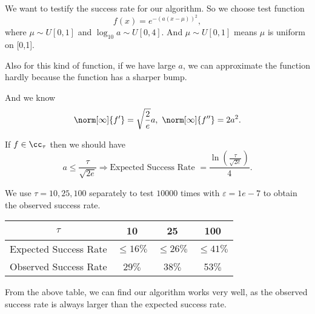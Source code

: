 We want to testify the success rate for our algorithm. So we
choose test function $$f(x)=e^{-(a(x-\mu))^2},$$
where $\mu \sim U[0,1]$ and $\log_{10} a \sim U[0,4].$
And $\mu \sim U[0,1]$ means $\mu$ is uniform on [0,1].

Also for this kind of function, if we have large $a$, we can approximate the function hardly
because the function has a sharper bump.

And we know
$$\norm[\infty]{f'}=\sqrt{\frac{2}{e}} a, \ \norm[\infty]{f''}=2a^2.$$

If $f \in \cc_{\tau}$ then we should have
$$a \leq \frac{\tau}{\sqrt{2e}} \Rightarrow \text{Expected Success Rate }= \frac{\ln \left(\frac{\tau}{\sqrt{2e}}\right)}{4}.$$

We use $\tau = 10, 25 , 100$ separately to test $10000$ times with
$\varepsilon = 1e-7$ to obtain the observed success rate.
\begin{table}[H]
\begin{tabular}{|c |c |c| c |}
\hline
$\tau$ &  10 & 25 & 100\\
\hline
Expected Success Rate &  $\leq 16 \%$ &  $\leq 26 \%$  & $\leq 41 \%$ \\
  \hline
Observed Success Rate & 29$\%$ &  38$\%$  & 53$\%$ \\
\hline
\end{tabular}
\end{table}
From the above table, we can find our algorithm works very well, as the observed
success rate is always larger than the expected success rate.\\




